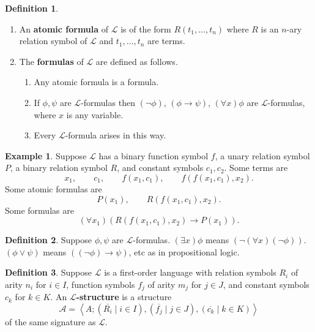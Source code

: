 \documentclass{article}
\newcommand{\A}{\mathcal{A}}
\renewcommand{\L}{\mathcal{L}}
\newcommand{\rb}[1]{\left( #1 \right)}
\newcommand{\ab}[1]{\left\langle #1 \right\rangle}
\newcommand{\notb}[1]{\rb{\neg #1}}
\newcommand{\orb}[2]{\rb{#1 \lor #2}}
\newcommand{\impb}[2]{\rb{#1 \rightarrow #2}}
\newcommand{\fab}[1]{\rb{\forall #1}}
\newcommand{\teb}[1]{\rb{\exists #1}}
\theoremstyle{definition}\newtheorem{definition}{Definition}[subsection]
\theoremstyle{definition}\newtheorem{remark}[definition]{Remark}
\theoremstyle{definition}\newtheorem*{example}{Example}
\theoremstyle{definition}\newtheorem*{note}{Note}
\begin{document}

\begin{definition}
\hfill
\begin{enumerate}
\item An \textbf{atomic formula} of $ \L $ is of the form $ R\rb{t_1, \dots, t_n} $ where $ R $ is an $ n $-ary relation symbol of $ \L $ and $ t_1, \dots, t_n $ are terms.
\item The \textbf{formulas} of $ \L $ are defined as follows.
\begin{enumerate}
\item Any atomic formula is a formula.
\item If $ \phi, \psi $ are $ \L $-formulas then $ \notb{\phi} $, $ \impb{\phi}{\psi} $, $ \fab{x}\phi $ are $ \L $-formulas, where $ x $ is any variable.
\item Every $ \L $-formula arises in this way.
\end{enumerate}
\end{enumerate}
\end{definition}

\begin{example}
Suppose $ \L $ has a binary function symbol $ f $, a unary relation symbol $ P $, a binary relation symbol $ R $, and constant symbols $ c_1, c_2 $. Some terms are
$$ x_1, \qquad c_1, \qquad f\rb{x_1, c_1}, \qquad f\rb{f\rb{x_1, c_1}, x_2}. $$
Some atomic formulas are
$$ P\rb{x_1}, \qquad R\rb{f\rb{x_1, c_1}, x_2}. $$
Some formulas are
$$ \fab{x_1}\impb{R\rb{f\rb{x_1, c_1}, x_2}}{P\rb{x_1}}. $$
\end{example}

\begin{definition}
Suppose $ \phi, \psi $ are $ \L $-formulas. $ \teb{x}\phi $ means $ \notb{\fab{x}\notb{\phi}} $. $ \orb{\phi}{\psi} $ means $ \impb{\notb{\phi}}{\psi} $, etc as in propositional logic.
\end{definition}

\begin{definition}
Suppose $ \L $ is a first-order language with relation symbols $ R_i $ of arity $ n_i $ for $ i \in I $, function symbols $ f_j $ of arity $ m_j $ for $ j \in J $, and constant symbols $ c_k $ for $ k \in K $. An \textbf{$ \L $-structure} is a structure
$$ \A = \ab{A; \rb{\overline{R_i} \mid i \in I}, \rb{\overline{f_j} \mid j \in J}, \rb{\overline{c_k} \mid k \in K}} $$
of the same signature as $ \L $.
\end{definition}
\end{document}
